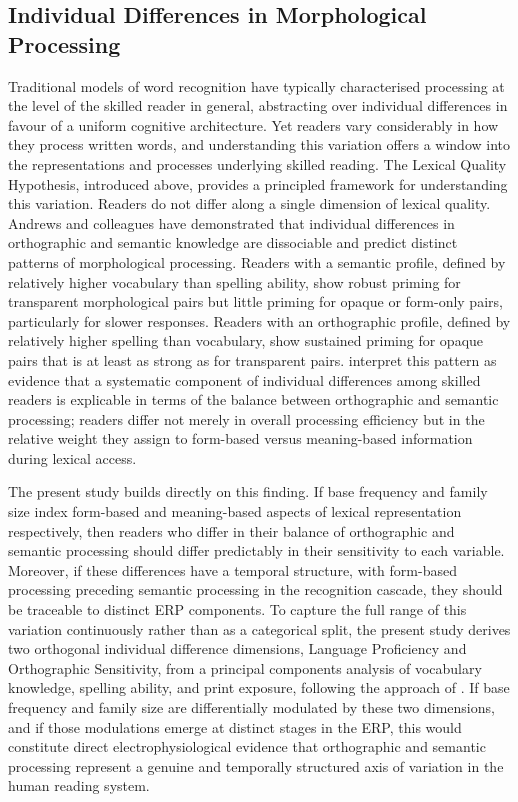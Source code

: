 \subsection{Individual Differences in Morphological Processing}

Traditional models of word recognition have typically characterised processing at the level of the skilled reader in general, abstracting over individual differences in favour of a uniform cognitive architecture. Yet readers vary considerably in how they process written words, and understanding this variation offers a window into the representations and processes underlying skilled reading. The Lexical Quality Hypothesis, introduced above, provides a principled framework for understanding this variation. Readers do not differ along a single dimension of lexical quality. Andrews and colleagues  \citep{andrewsIndividualDifferencesSkilled2012, andrewsMorphologicalPrimingStronger2013} have demonstrated that individual differences in orthographic and semantic knowledge are dissociable and predict distinct patterns of morphological processing. Readers with a semantic profile, defined by relatively higher vocabulary than spelling ability, show robust priming for transparent morphological pairs but little priming for opaque or form-only pairs, particularly for slower responses. Readers with an orthographic profile, defined by relatively higher spelling than vocabulary, show sustained priming for opaque pairs that is at least as strong as for transparent pairs. \citet{andrewsMorphologicalPrimingStronger2013} interpret this pattern as evidence that a systematic component of individual differences among skilled readers is explicable in terms of the balance between orthographic and semantic processing; readers differ not merely in overall processing efficiency but in the relative weight they assign to form-based versus meaning-based information during lexical access.

The present study builds directly on this finding. If base frequency and family size index form-based and meaning-based aspects of lexical representation respectively, then readers who differ in their balance of orthographic and semantic processing should differ predictably in their sensitivity to each variable. Moreover, if these differences have a temporal structure, with form-based processing preceding semantic processing in the recognition cascade, they should be traceable to distinct ERP components. To capture the full range of this variation continuously rather than as a categorical split, the present study derives two orthogonal individual difference dimensions, Language Proficiency and Orthographic Sensitivity, from a principal components analysis of vocabulary knowledge, spelling ability, and print exposure, following the approach of \citet{andrewsMorphologicalPrimingStronger2013}. If base frequency and family size are differentially modulated by these two dimensions, and if those modulations emerge at distinct stages in the ERP, this would constitute direct electrophysiological evidence that orthographic and semantic processing represent a genuine and temporally structured axis of variation in the human reading system.


